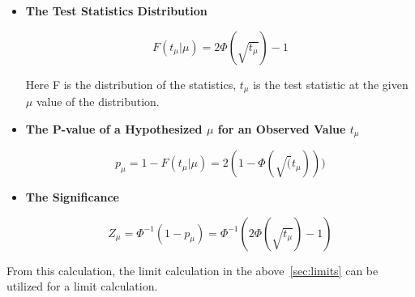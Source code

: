\begin{itemize}
    \item \textbf{The Test Statistics Distribution}

\begin{equation}
    F(t_{\mu}| \mu) = 2\Phi(\sqrt{t_{\mu}})-1
\label{eq:teststatistics}
\end{equation}

Here F is the distribution of the statistics, $t_\mu$ is the test statistic at the given $\mu$ value of the distribution. 

\item \textbf{The P-value of a Hypothesized $\mu$ for an Observed Value $t_\mu$}

\begin{equation}
p_{\mu} = 1-F(t_{\mu}| \mu)=2(1-\Phi(\sqrt(t_{\mu})))
\end{equation}


\item \textbf{The Significance}

\begin{equation}
Z_{\mu} = \Phi^{-1}(1-p_{\mu})  = \Phi^{-1}(2\Phi(\sqrt{t_{\mu}})-1)
\end{equation}

\end{itemize}

From this calculation, the limit calculation in the above~\ref{sec:limits} can be utilized for a limit calculation. 

%
%
%



%
%



